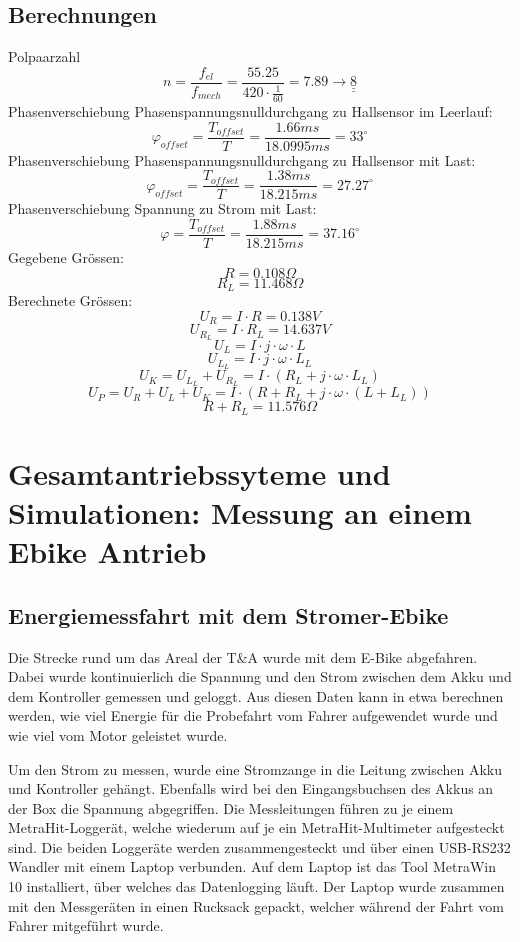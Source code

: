 \documentclass[a4,paper,fleqn]{article}
\newcommand{\uuline}[1]{{\underline{\underline{#1}}}}
\begin{document}
\subsection{Berechnungen}
Polpaarzahl
\[ n = \frac{f_{el}}{f_{mech}} = \frac{55.25}{420 \cdot \frac{1}{60}} = 7.89 \to \uuline{8} \]
Phasenverschiebung Phasenspannungsnulldurchgang zu Hallsensor im Leerlauf: 
\[ \varphi_{offset} = \frac{T_{offset}}{T} = \frac{1.66 ms}{18.0995 ms} = 33^\circ \]
Phasenverschiebung Phasenspannungsnulldurchgang zu Hallsensor mit Last: 
\[ \varphi_{offset} = \frac{T_{offset}}{T} = \frac{1.38 ms}{18.215 ms} = 27.27^\circ \]
Phasenverschiebung Spannung zu Strom mit Last: 
\[ \varphi = \frac{T_{offset}}{T} = \frac{1.88 ms}{18.215 ms} = 37.16^\circ \]
Gegebene Grössen: 
\[ R = 0.108 \Omega \]
\[ R_L = 11.468 \Omega \]
Berechnete Grössen: 
\[ U_R = I \cdot R = 0.138 V \]
\[ U_{R_L} = I \cdot R_L = 14.637 V \]
\[ U_{L} = I \cdot j \cdot \omega \cdot L \]
\[ U_{L_L} = I \cdot j \cdot \omega \cdot L_L \]
\[ U_K = U_{L_L} + U_{R_L}  = I \cdot (R_L + j \cdot \omega \cdot L_L)\]
\[ U_P = U_R + U_L + U_K = I \cdot (R + R_L + j \cdot \omega \cdot (L + L_L)) \]
\[ R + R_L = 11.576 \Omega \]

\section{Gesamtantriebssyteme und Simulationen: Messung an einem Ebike Antrieb}

\subsection{Energiemessfahrt mit dem Stromer-Ebike}
Die Strecke rund um das Areal der T\&A wurde mit dem E-Bike abgefahren. Dabei 
wurde kontinuierlich die Spannung und den Strom zwischen dem Akku und dem 
Kontroller gemessen und geloggt. Aus diesen Daten kann in etwa berechnen 
werden, wie viel Energie für die Probefahrt vom Fahrer aufgewendet wurde und 
wie viel vom Motor geleistet wurde.

\noindent
Um den Strom zu messen, wurde eine Stromzange in die Leitung zwischen Akku und 
Kontroller gehängt. Ebenfalls wird bei den Eingangsbuchsen des Akkus an der 
Box die Spannung abgegriffen. Die Messleitungen führen zu je einem 
MetraHit-Loggerät, welche wiederum auf je ein MetraHit-Multimeter aufgesteckt 
sind. Die beiden Loggeräte werden zusammengesteckt und über einen USB-RS232 
Wandler mit einem Laptop verbunden. Auf dem Laptop ist das Tool MetraWin 10 
installiert, über welches das Datenlogging läuft. Der Laptop wurde zusammen 
mit den Messgeräten in einen Rucksack gepackt, welcher während der Fahrt vom 
Fahrer mitgeführt wurde.
\end{document}
